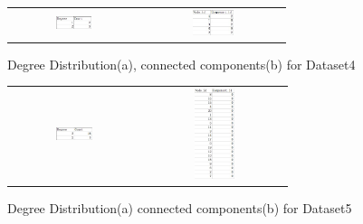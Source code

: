 \begin{figure}[H]
\begin{center}
\begin{tabular}{cc}
     \includegraphics[width=0.3\textwidth]{FIG/4dd.jpg} &
     \includegraphics[width=0.3\textwidth]{FIG/4cc.jpg} \\
\end{tabular}
\caption{Degree Distribution(a), connected components(b) for Dataset4}
\end{center}
\end{figure}

\begin{figure}[H]
\begin{center}
\begin{tabular}{cc}
     \includegraphics[width=0.3\textwidth]{FIG/5dd.jpg} &
     \includegraphics[width=0.3\textwidth]{FIG/5cc.jpg} \\
\end{tabular}
\caption{Degree Distribution(a) connected components(b) for Dataset5}
\end{center}
\end{figure}


